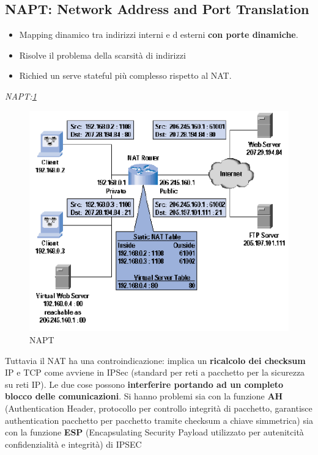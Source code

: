 \documentclass[12pt]{article}
\begin{document}
		\subsection{NAPT: Network Address and Port Translation}
			\begin{itemize}
				\item Mapping dinamico tra indirizzi interni e d esterni \textbf{con porte dinamiche}.
				\item Risolve il problema della scarsità di indirizzi
				\item Richied un serve stateful più complesso rispetto al NAT.
			\end{itemize}
			
			\textit{NAPT:\ref{fig:4}}
			\begin{figure}[h!]
				\centering
				\includegraphics[scale=0.60]{img/natp.PNG}
				\caption{NAPT\label{fig:4}}
			\end{figure}
			
			Tuttavia il NAT ha una controindicazione: implica un \textbf{ricalcolo dei checksum} IP e TCP come avviene in IPSec (standard per reti a pacchetto per la sicurezza su reti IP). Le due cose possono \textbf{interferire portando ad un completo blocco delle comunicazioni}. Si hanno problemi sia con la funzione \textbf{AH} (Authentication Header, protocollo per controllo integrità di pacchetto, garantisce authentication pacchetto per pacchetto tramite checksum a chiave simmetrica) sia con la funzione \textbf{ESP} (Encapsulating Security Payload utilizzato per autenitcità confidenzialità e integrità) di IPSEC\\
			
\end{document}
